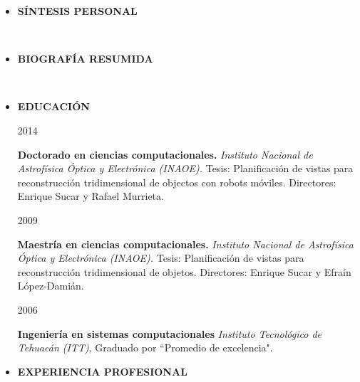 \documentclass[10pt]{article}
\begin{document}
\begin{itemize}
	
\item{\bf SÍNTESIS PERSONAL}

 \\

\item{\bf BIOGRAFÍA RESUMIDA}

 \\
	
\item{\bf EDUCACIÓN} \\

\begin{minipage}{1.5 in}
	2014\\
\end{minipage}
\begin{minipage}{4.5in}
	\textbf{Doctorado en ciencias computacionales.} \textit{Instituto Nacional de Astrofísica Óptica y Electrónica (INAOE).} Tesis: Planificación de vistas para reconstrucción tridimensional de objectos con robots móviles. Directores: Enrique Sucar y Rafael Murrieta.\\ 
\end{minipage}

\begin{minipage}{1.5 in}
	2009\\
\end{minipage}
\begin{minipage}{4.5in}
	\textbf{Maestría en ciencias computacionales.} \textit{Instituto Nacional de Astrofísica Óptica y Electrónica (INAOE).} Tesis: Planificación de vistas para reconstrucción tridimensional de objetos. Directores: Enrique Sucar y Efraín López-Damián.\\ 
\end{minipage}

\begin{minipage}{1.5 in}
	2006\\
\end{minipage}
\begin{minipage}{4.5in}
	\textbf{Ingeniería en sistemas computacionales} \textit{Instituto Tecnológico de Tehuacán (ITT)}, Graduado por ``Promedio de excelencia".\\ 
\end{minipage}

\item {\bf EXPERIENCIA PROFESIONAL} \\


\end{itemize}
\end{document}
